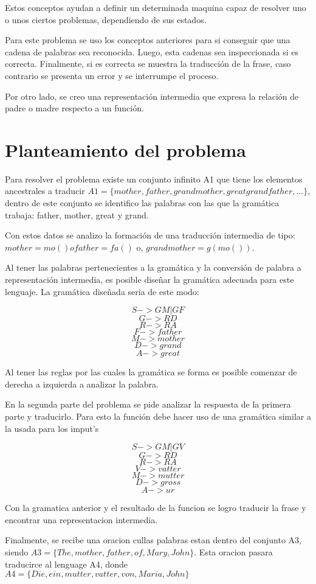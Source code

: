 \documentclass[conference]{IEEEtran}
\begin{document}
Estos conceptos ayudan a definir un determinada maquina capaz de resolver uno o unos ciertos problemas, dependiendo de sus estados.

Para este problema se uso los conceptos anteriores para si conseguir que una cadena de palabras sea reconocida. Luego, esta cadenas sea inspeccionada si es correcta. Finalmente, si es correcta se muestra la traducci\'on de la frase, caso contrario se presenta un error y se interrumpe el proceso.

Por otro lado, se creo una representaci\'on intermedia que expresa la relaci\'on de padre o madre respecto a un funci\'on.

\section{Planteamiento del problema}

Para resolver el problema existe un conjunto infinito A1 que tiene los elementos ancestrales a traducir $A1 = \{mother, father, grandmother, greatgrandfather, ...\}$, 
dentro de este conjunto se identifico las palabras con las que la gram\'atica trabaja: father, mother, great y grand.

Con estos datos se analizo la formaci\'on de una traducci\'on intermedia de tipo:
$mother = mo() o father = fa()$ o,
$grandmother = g(mo())$. 

Al tener las palabras pertenecientes a la gram\'atica y la conversi\'on de palabra a representaci\'on intermedia, es posible diseñar la gram\'atica adecuada para este lenguaje. La gram\'atica diseñada seria de este modo:

$$S-> G M | G F  $$
$$G-> R D $$
$$R-> R A $$
$$F-> father$$
$$M-> mother$$
$$D-> grand$$
$$A-> great$$

Al tener las reglas por las cuales la gram\'atica se forma es posible comenzar de derecha a izquierda a analizar la palabra.

En la segunda parte del problema se pide analizar la respuesta de la primera parte y traducirlo. Para esto la funci\'on debe hacer uso de una gram\'atica similar a la usada para los imput's

$$S-> G M | G V  $$
$$G-> R D $$
$$R-> R A $$
$$V-> vatter$$
$$M-> mutter$$
$$D-> gross$$
$$A-> ur$$

Con la gramatica anterior y el resultado de la funcion se logro traducir la frase y encontrar una representacion intermedia.

Finalmente, se recibe una oracion cullas palabras estan dentro del conjunto A3, siendo $A3 = \{The, mother, father, of, Mary, John \}$. Esta oracion pasara traducirce al lenguage A4, donde $A4 = \{Die, ein, mutter, vatter, von, Maria, John \}$
\end{document}
